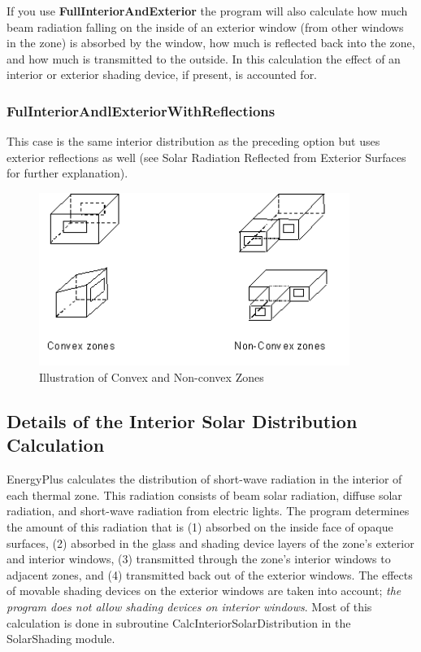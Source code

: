 If you use \textbf{FullInteriorAndExterior} the program will also calculate how much beam radiation falling on the inside of an exterior window (from other windows in the zone) is absorbed by the window, how much is reflected back into the zone, and how much is transmitted to the outside. In this calculation the effect of an interior or exterior shading device, if present, is accounted for.

\subsubsection{FulInteriorAndlExteriorWithReflections}\label{fulinteriorandlexteriorwithreflections}

This case is the same interior distribution as the preceding option but uses exterior reflections as well (see Solar Radiation Reflected from Exterior Surfaces for further explanation).

\begin{figure}[hbtp] %
\centering
\includegraphics[width=0.9\textwidth, height=0.9\textheight, keepaspectratio=true]{media/image646.png}
\caption{Illustration of Convex and Non-convex Zones \protect \label{fig:illustration-of-convex-and-non-convex-zones}}
\end{figure}

\subsection{Details of the Interior Solar Distribution Calculation}\label{details-of-the-interior-solar-distribution-calculation}

EnergyPlus calculates the distribution of short-wave radiation in the interior of each thermal zone. This radiation consists of beam solar radiation, diffuse solar radiation, and short-wave radiation from electric lights. The program determines the amount of this radiation that is (1) absorbed on the inside face of opaque surfaces, (2) absorbed in the glass and shading device layers of the zone's exterior and interior windows, (3) transmitted through the zone's interior windows to adjacent zones, and (4) transmitted back out of the exterior windows. The effects of movable shading devices on the exterior windows are taken into account; \emph{the program does not allow shading devices on interior windows}. Most of this calculation is done in subroutine CalcInteriorSolarDistribution in the SolarShading module.

